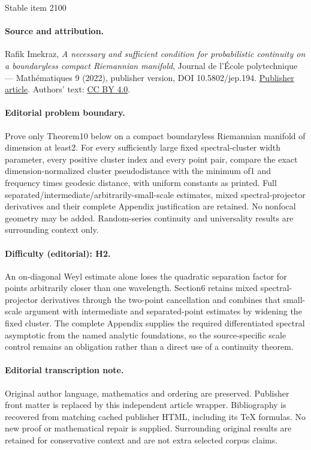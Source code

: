 \documentclass[11pt]{article}
\theoremstyle{theorem}
\theoremstyle{definition}
\begin{document}
\begin{center}{\Large Stable item 2100}\end{center}
\paragraph{Source and attribution.}
Rafik Imekraz, \emph{A necessary and sufficient condition for probabilistic continuity on a boundaryless compact Riemannian manifold}, Journal de l’École polytechnique — Mathématiques 9 (2022), publisher version, DOI 10.5802/jep.194. \href{https://jep.centre-mersenne.org/articles/10.5802/jep.194/}{Publisher article}. Authors' text: \href{https://creativecommons.org/licenses/by/4.0/}{CC BY 4.0}.
\paragraph{Editorial problem boundary.}
Prove only Theorem10 below on a compact boundaryless Riemannian manifold of dimension at least2. For every sufficiently large fixed spectral-cluster width parameter, every positive cluster index and every point pair, compare the exact dimension-normalized cluster pseudodistance with the minimum of1 and frequency times geodesic distance, with uniform constants as printed. Full separated/intermediate/arbitrarily-small-scale estimates, mixed spectral-projector derivatives and their complete Appendix justification are retained. No nonfocal geometry may be added. Random-series continuity and universality results are surrounding context only.
\paragraph{Difficulty (editorial): H2.}
An on-diagonal Weyl estimate alone loses the quadratic separation factor for points arbitrarily closer than one wavelength. Section6 retains mixed spectral-projector derivatives through the two-point cancellation and combines that small-scale argument with intermediate and separated-point estimates by widening the fixed cluster. The complete Appendix supplies the required differentiated spectral asymptotic from the named analytic foundations, so the source-specific scale control remains an obligation rather than a direct use of a continuity theorem.
\paragraph{Editorial transcription note.}
Original author language, mathematics and ordering are preserved. Publisher front matter is replaced by this independent article wrapper. Bibliography is recovered from matching cached publisher HTML, including its TeX formulas. No new proof or mathematical repair is supplied. Surrounding original results are retained for conservative context and are not extra selected corpus claims.
\clearpage
\end{document}
